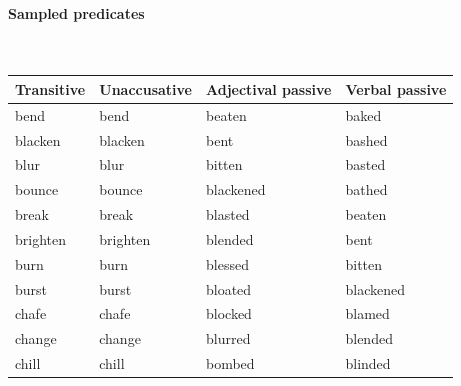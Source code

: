\documentclass[output=paper]{langsci/langscibook}
\begin{document}
\begin{subappendices}
\paragraph*{Sampled predicates}\leavevmode\\[.5\baselineskip]
{\smaller
\begin{tabularx}{\textwidth}{XXXX}
{\bfseries Transitive}  & {\bfseries Unaccusative} & {\bfseries Adjectival passive} & {\bfseries Verbal passive}\\
\midrule
bend      & bend      & beaten     & baked\\
blacken   & blacken   & bent       & bashed\\
blur      & blur      & bitten     & basted\\
bounce    & bounce    & blackened  & bathed\\
break     & break     & blasted    & beaten\\
brighten  & brighten  & blended    & bent\\
burn      & burn      & blessed    & bitten \\
burst     & burst     & bloated    & blackened\\
chafe     & chafe     & blocked    & blamed\\
change    & change    & blurred    & blended\\
chill     & chill     & bombed     & blinded\\
\end{tabularx}
}


\end{subappendices}
\end{document}
